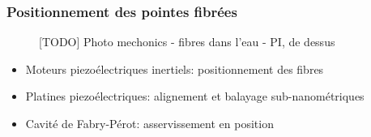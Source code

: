 \documentclass[9pt,a9paper,handout]{beamer}
\begin{document}
    \begin{frame}
        \frametitle{Positionnement des pointes fibrées}
        \begin{figure}\centering
            \caption{[TODO] Photo mechonics - fibres dans l'eau - PI, de dessus}
        \end{figure}
        \begin{itemize}
            \item Moteurs piezoélectriques inertiels: positionnement des fibres
            \item Platines piezoélectriques: alignement et balayage sub-nanométriques
        \vspace*{2mm}
            \item Cavité de Fabry-Pérot: asservissement en position
        \end{itemize}
        \vspace*{3mm}
        \begin{minipage}{\textwidth}
            \centering
            \hspace*{3mm}
        \end{minipage}
    \end{frame}
\end{document}
